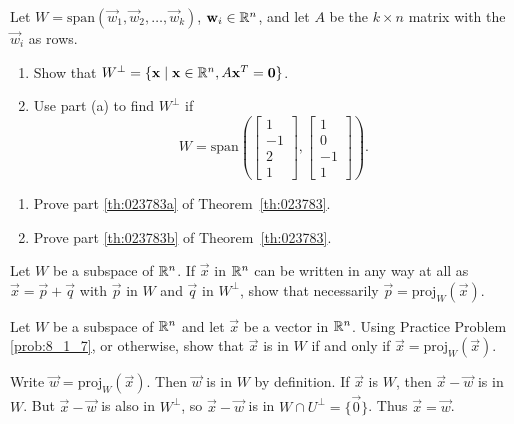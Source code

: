\documentclass{ximera}
\begin{document}
\begin{problem}\label{Uperp}
Let $W = \mbox{span}\left(\vec{w}_{1}, \vec{w}_{2}, \dots, \vec{w}_{k}\right)$, $\mathbf{w}_{i}\in \mathbb{R}^n$, and let $A$ be the $k \times n$ matrix with the $\vec{w}_{i}$ as rows.


\begin{enumerate}
\item Show that $W^\perp = \{\mathbf{x} \mid  \mathbf{x}\in \mathbb{R}^n, A\mathbf{x}^{T} = \mathbf{0}\}$.

\item Use part (a) to find $W^\perp$ if $$W = \mbox{span}\left(\begin{bmatrix}1\\ -1\\ 2\\ 1\end{bmatrix}, \begin{bmatrix}1\\ 0\\ -1\\ 1\end{bmatrix}\right).$$
\end{enumerate}

\end{problem}

\begin{problem}\label{prob:8_1_6}
\begin{enumerate}
\item Prove part \ref{th:023783a} of Theorem~\ref{th:023783}.

\item Prove part \ref{th:023783b} of Theorem~\ref{th:023783}.

\end{enumerate}
\end{problem}

\begin{problem} \label{prob:8_1_7}
Let $W$ be a subspace of $\mathbb{R}^n$. If $\vec{x}$ in $\mathbb{R}^n$ can be written in any way at all as $\vec{x} = \vec{p} + \vec{q}$ with $\vec{p}$ in $W$ and $\vec{q}$ in $W^\perp$, show that necessarily $\vec{p} = \mbox{proj}_W(\vec{x})$.
\end{problem}

\begin{problem}\label{prob:8_1_8}
Let $W$ be a subspace of $\mathbb{R}^n$ and let $\vec{x}$ be a vector in $\mathbb{R}^n$. Using Practice Problem \ref{prob:8_1_7}, or otherwise, show that $\vec{x}$ is in $W$ if and only if $\vec{x} = \mbox{proj}_W(\vec{x})$.

\begin{hint}
Write $\vec{w} = \mbox{proj}_W(\vec{x})$. Then $\vec{w}$ is in $W$ by definition. If $\vec{x}$ is $W$, then $\vec{x} - \vec{w}$ is in $W$. But $\vec{x} - \vec{w}$ is also in $W^\perp$, so $\vec{x} - \vec{w}$ is in $W \cap U^\perp = \{\vec{0}\}$. Thus $\vec{x} = \vec{w}$.
\end{hint}
\end{problem}
\end{document}
